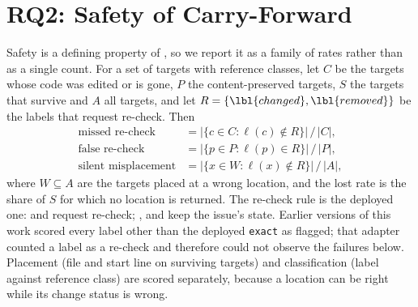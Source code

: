 \section{RQ2: Safety of Carry-Forward}\label{sec:safety}
Safety is a defining property of \sys{}, so we report it as a family of rates rather than as a single count. For a set of targets with reference classes, let $C$ be the targets whose code was edited or is gone, $P$ the content-preserved targets, $S$ the targets that survive and $A$ all targets, and let $R=\{\lbl{changed},\lbl{removed}\}$ be the labels that request re-check. Then
\begin{align}
\text{missed re-check} &= |\{c\in C : \ell(c)\notin R\}|\,/\,|C|,\label{eq:missed}\\
\text{false re-check} &= |\{p\in P : \ell(p)\in R\}|\,/\,|P|,\\
\text{silent misplacement} &= |\{x\in W : \ell(x)\notin R\}|\,/\,|A|,
\end{align}
where $W\subseteq A$ are the targets placed at a wrong location, and the lost rate is the share of $S$ for which no location is returned. The re-check rule is the deployed one:  and  request re-check; ,  and  keep the issue's state. Earlier versions of this work scored every label other than the deployed \texttt{exact} as flagged; that adapter counted a  label as a re-check and therefore could not observe the failures below. Placement (file and start line on surviving targets) and classification (label against reference class) are scored separately, because a location can be right while its change status is wrong.

